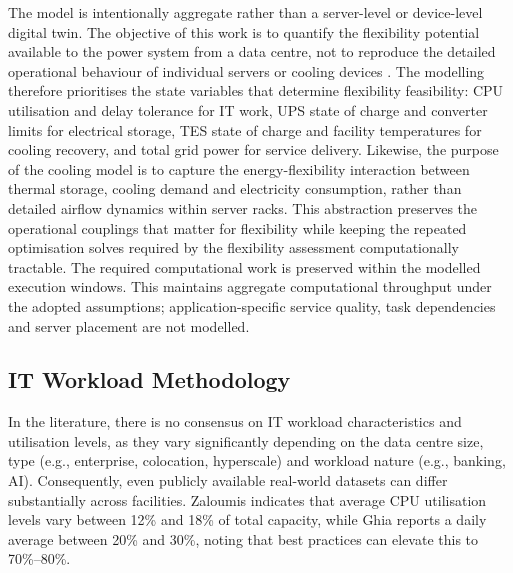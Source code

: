 \documentclass[lettersize,journal]{IEEEtran}
\providecommand{\DIFadd}[1]{{\color{blue}#1}}
\providecommand{\DIFaddbegin}{}
\providecommand{\DIFaddend}{}
\begin{document}
\DIFaddbegin \DIFadd{The model is intentionally aggregate rather than a server-level or device-level digital twin. The objective of this work is to quantify the flexibility potential available to the power system from a data centre, not to reproduce the detailed operational behaviour of individual servers or cooling devices \cite{barroso2018datacenter,dayarathna2015data}. The modelling therefore prioritises the state variables that determine flexibility feasibility: CPU utilisation and delay tolerance for IT work, UPS state of charge and converter limits for electrical storage, TES state of charge and facility temperatures for cooling recovery, and total grid power for service delivery. Likewise, the purpose of the cooling model is to capture the energy-flexibility interaction between thermal storage, cooling demand and electricity consumption, rather than detailed airflow dynamics within server racks. This abstraction preserves the operational couplings that matter for flexibility while keeping the repeated optimisation solves required by the flexibility assessment computationally tractable. The required computational work is preserved within the modelled execution windows. This maintains aggregate computational throughput under the adopted assumptions; application-specific service quality, task dependencies and server placement are not modelled.

}

\DIFaddend \label{sec: methodology}
\subsection{IT Workload Methodology}\DIFaddbegin \label{sec:it-workload-methodology}
 
\DIFaddend 

In the literature, there is no consensus on IT workload characteristics and utilisation levels, as they vary significantly depending on the data centre size, type (e.g., enterprise, colocation, hyperscale) and workload nature (e.g., banking, AI). Consequently, even publicly available real-world datasets can differ substantially across facilities.  Zaloumis \cite{Zaloumis2022IBM} indicates that average CPU  \DIFaddbegin \DIFadd{utilisation levels }\DIFaddend vary between 12\% and 18\% of total capacity, while  \DIFaddbegin \DIFadd{Ghia \cite{Ghia2011McKinsey} reports }\DIFaddend a daily average between 20\% and 30\%, noting that best practices can elevate this to 70\%--80\%. 
\end{document}
